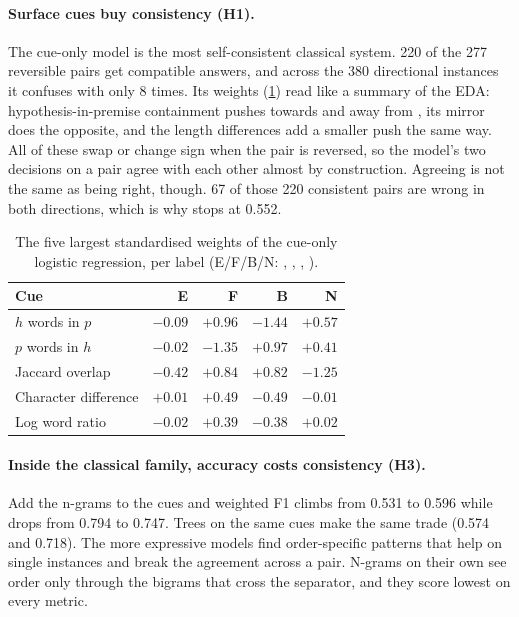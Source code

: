 \paragraph{Surface cues buy consistency (H1).}
The cue-only model is the most self-consistent classical system. 220 of the 277 reversible pairs get compatible answers, and across the 380 directional instances it confuses \FW{} with \BW{} only 8 times. Its weights (\cref{tab:weights}) read like a summary of the EDA: hypothesis-in-premise containment pushes towards \FW{} and away from \BW{}, its mirror does the opposite, and the length differences add a smaller push the same way. All of these swap or change sign when the pair is reversed, so the model's two decisions on a pair agree with each other almost by construction. Agreeing is not the same as being right, though. 67 of those 220 consistent pairs are wrong in both directions, which is why \HardCons{} stops at 0.552.

\begin{table}[t]
\centering
\footnotesize
\setlength{\tabcolsep}{5pt}
\begin{tabular}{@{}lrrrr@{}}
\toprule
Cue & E & F & B & N \\
\midrule
$h$ words in $p$ & $-0.09$ & $+0.96$ & $-1.44$ & $+0.57$ \\
$p$ words in $h$ & $-0.02$ & $-1.35$ & $+0.97$ & $+0.41$ \\
Jaccard overlap & $-0.42$ & $+0.84$ & $+0.82$ & $-1.25$ \\
Character difference & $+0.01$ & $+0.49$ & $-0.49$ & $-0.01$ \\
Log word ratio & $-0.02$ & $+0.39$ & $-0.38$ & $+0.02$ \\
\bottomrule
\end{tabular}
\caption{The five largest standardised weights of the cue-only logistic regression, per label (E/F/B/N: \EQ, \FW, \BW, \NO).}
\label{tab:weights}
\end{table}

\paragraph{Inside the classical family, accuracy costs consistency (H3).}
Add the n-grams to the cues and weighted F1 climbs from 0.531 to 0.596 while \SoftCons{} drops from 0.794 to 0.747. Trees on the same cues make the same trade (0.574 and 0.718). The more expressive models find order-specific patterns that help on single instances and break the agreement across a pair. N-grams on their own see order only through the bigrams that cross the separator, and they score lowest on every metric.


